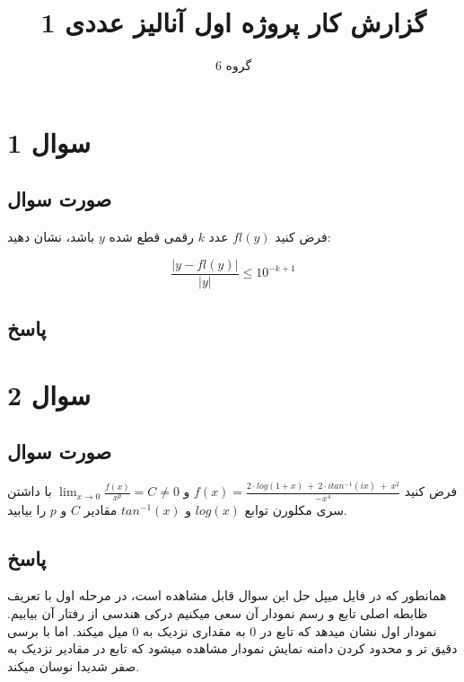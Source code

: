 \documentclass[12pt, letterpaper]{article}
\title{گزارش کار پروژه اول آنالیز عددی 1}
\author{گروه 6}
\begin{document}
\maketitle

\section{سوال 1}
\subsection{صورت سوال}
فرض کنید \(fl(y)\) عدد \(k\) رقمی قطع شده \(y\) باشد، نشان دهید:

\[\frac{\big| y-fl(y) \big| }{\big| y \big|} \le 10^{-k+1}\]

\subsection{پاسخ}



\vspace{5mm}

\section{سوال 2}
\subsection{صورت سوال}
فرض کنید
\(f(x) = \frac{2 \cdot log(1+x) \: + \: 2 \cdot i tan^{-1}(ix) \: + \: x^2}{-x^4}\)
و 
\(\lim_{x\to 0}\frac{f(x)}{x^p} = C \ne 0\)
با داشتن سری مکلورن توابع 
\(log(x)\)
و 
\(tan^{-1}(x)\)
مقادیر 
\(C\)
و 
\(p\)
را بیابید.

\subsection{پاسخ}
همانطور که در فایل میپل حل این سوال قابل مشاهده است، در مرحله اول با تعریف ظابطه اصلی تابع و رسم نمودار آن سعی میکنیم درکی هندسی از رفتار آن بیابیم. نمودار اول نشان میدهد که تابع در 0 به مقداری نزدیک به 0 میل میکند. اما با برسی دقیق تر و محدود کردن دامنه نمایش نمودار مشاهده میشود که تابع در مقادیر نزدیک به صفر شدیدا نوسان میکند. \\
\end{document}
